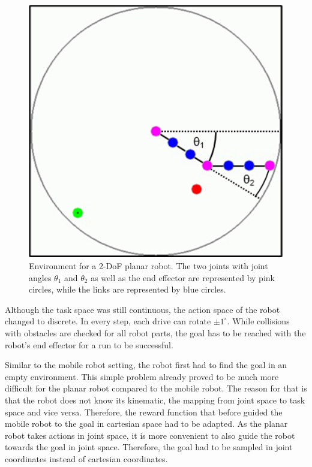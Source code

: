 \documentclass[conference]{IEEEtran}
\begin{document}
\begin{figure}[htbp]
	\centerline{\includegraphics{2dof.png}}
	\caption{Environment for a 2-DoF planar robot. The two joints with joint angles $\theta_1$ and $\theta_2$ as well as the end effector are represented by pink circles, while the links are represented by blue circles.}
	\label{fig4}
\end{figure}

Although the task space was still continuous, the action space of the robot changed to discrete. In every step, each drive can rotate $\pm 1^{\circ}$. While collisions with obstacles are checked for all robot parts, the goal has to be reached with the robot's end effector for a run to be successful. 

Similar to the mobile robot setting, the robot first had to find the goal in an empty environment. This simple problem already proved to be much more difficult for the planar robot compared to the mobile robot. The reason for that is that the robot does not know its kinematic, the mapping from joint space to task space and vice versa. Therefore, the reward function that before guided the mobile robot to the goal in cartesian space had to be adapted. As the planar robot takes actions in joint space, it is more convenient to also guide the robot towards the goal in joint space. Therefore, the goal had to be sampled in joint coordinates instead of cartesian coordinates. 
\end{document}
